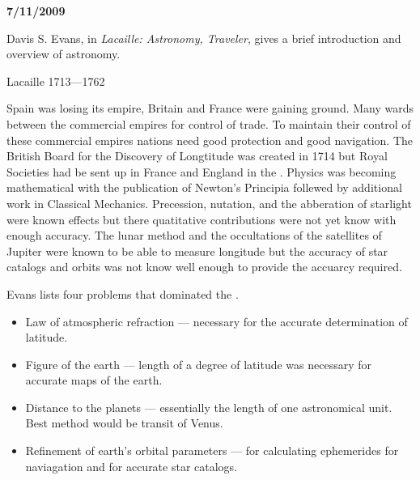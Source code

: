 
{\bf 7/11/2009}

Davis S. Evans, in \emph{Lacaille: Astronomy, Traveler}, \cite{evans:1992}
gives a brief introduction and overview of  astronomy.

Lacaille 1713---1762

Spain was losing its empire, Britain and France were gaining ground.
Many wards between the commercial empires for control of trade.  To
maintain their control of these commercial empires nations need good
protection and good navigation.  The British Board for the Discovery
of Longtitude was created in 1714 but Royal Societies had be sent up
in France and England in the .  Physics was becoming
mathematical with the publication of Newton's Principia follewed by
additional work in Classical Mechanics. Precession, nutation, and the
abberation of starlight were known effects but there quatitative
contributions were not yet know with enough accuracy.  The lunar
method and the occultations of the satellites of Jupiter were known
to be able to measure longitude but the accuracy of star catalogs and
orbits was not know well enough to provide the accuarcy required.

Evans lists four problems that dominated the .

\begin{itemize}

\item Law of atmospheric refraction --- necessary for the accurate
  determination of latitude.

\item Figure of the earth --- length of a degree of latitude was necessary
  for accurate maps of the earth.

\item Distance to the planets --- essentially the length of one
  astronomical unit.  Best method would be transit of Venus.

\item Refinement of earth's orbital parameters --- for calculating
ephemerides for naviagation and for accurate star catalogs.

\end{itemize}

